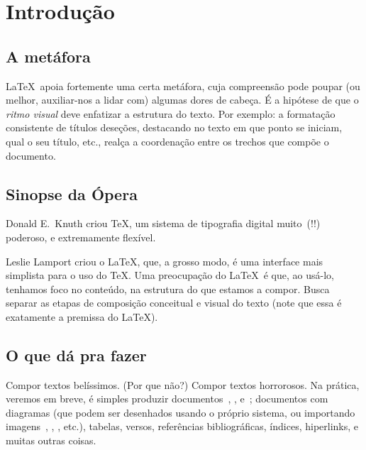 \section{Introdução}

\subsection{A metáfora}

\LaTeX\ apoia fortemente uma certa metáfora, cuja compreensão pode
poupar (ou melhor, auxiliar-nos a lidar com) algumas dores de cabeça.
É a hipótese de que o \emph{ritmo visual} deve enfatizar a estrutura
do texto. Por exemplo: a formatação consistente de títulos deseções,
destacando no texto em que ponto se iniciam, qual o seu título, etc.,
realça a coordenação entre os trechos que compõe o documento.

\subsection{Sinopse da Ópera}

Donald E.~Knuth criou \TeX, um sistema de tipografia digital muito~(!!)
poderoso, e extremamente flexível.

\begin{quotation}
\end{quotation}

Leslie Lamport criou o \LaTeX, que, a grosso modo, é uma interface
mais simplista para o uso do \TeX. Uma preocupação do \LaTeX\ é que,
ao usá-lo, tenhamos foco no conteúdo, na estrutura do que estamos a
compor. Busca separar as etapas de composição conceitual e visual do
texto (note que essa é exatamente a premissa do \LaTeX).  

\subsection{O que dá pra fazer}

Compor textos belíssimos. (Por que não?) Compor textos horrorosos. Na
prática, veremos em breve, é simples produzir
documentos~, , e~; documentos
com diagramas (que podem ser desenhados usando o próprio sistema, ou
importando imagens~, , ,
etc.), tabelas, versos, referências bibliográficas, índices,
hiperlinks, e muitas outras coisas.

